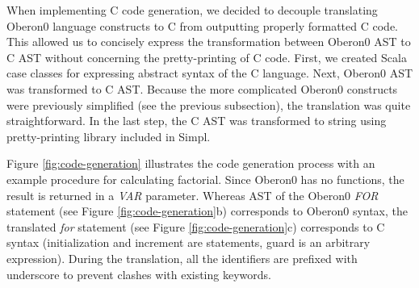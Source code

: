 When implementing C code generation, we decided to decouple translating
Oberon0 language constructs to C from outputting properly formatted
C code. This allowed us to concisely express the transformation between
Oberon0 AST to C AST without concerning the pretty-printing of C code.
First, we created Scala case classes for expressing abstract syntax
of the C language. Next, Oberon0 AST was transformed to C AST. Because
the more complicated Oberon0 constructs were previously simplified
(see the previous subsection), the translation was quite straightforward.
In the last step, the C AST was transformed to string using pretty-printing
library included in Simpl.

Figure \ref{fig:code-generation} illustrates the code generation
process with an example procedure for calculating factorial. Since
Oberon0 has no functions, the result is returned in a \emph{VAR} parameter.
Whereas AST of the Oberon0 \emph{FOR} statement (see Figure \ref{fig:code-generation}b)
corresponds to Oberon0 syntax, the translated \emph{for} statement
(see Figure \ref{fig:code-generation}c) corresponds to C syntax (initialization
and increment are statements, guard is an arbitrary expression). During
the translation, all the identifiers are prefixed with underscore
to prevent clashes with existing keywords.


